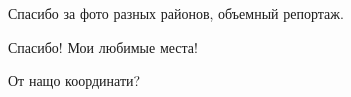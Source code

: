  
 
 
 
 

\qqSecCmt


Спасибо за фото разных районов, объемный репортаж.


Спасибо! Мои любимые места!


От нащо координати?
